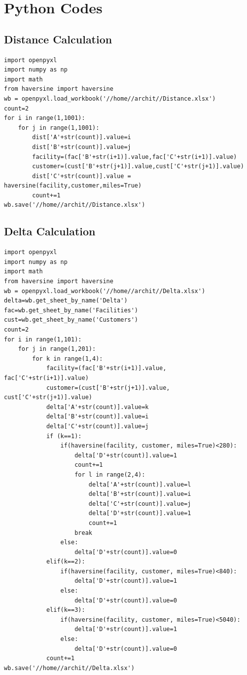 \documentclass[12pt]{article}
\numberwithin{equation}{section}
\begin{document}
\section{Python Codes}
\subsection{Distance Calculation}
\begin{verbatim}
import openpyxl
import numpy as np
import math
from haversine import haversine
wb = openpyxl.load_workbook('//home//archit//Distance.xlsx')
count=2
for i in range(1,1001):
    for j in range(1,1001):
        dist['A'+str(count)].value=i
        dist['B'+str(count)].value=j
        facility=(fac['B'+str(i+1)].value,fac['C'+str(i+1)].value)
        customer=(cust['B'+str(j+1)].value,cust['C'+str(j+1)].value)
        dist['C'+str(count)].value = haversine(facility,customer,miles=True)
        count+=1
wb.save('//home//archit//Distance.xlsx')
\end{verbatim}
\subsection{Delta Calculation}
\begin{verbatim}
import openpyxl
import numpy as np
import math
from haversine import haversine
wb = openpyxl.load_workbook('//home//archit//Delta.xlsx')
delta=wb.get_sheet_by_name('Delta')
fac=wb.get_sheet_by_name('Facilities')
cust=wb.get_sheet_by_name('Customers')
count=2
for i in range(1,101):
    for j in range(1,201):
        for k in range(1,4):
            facility=(fac['B'+str(i+1)].value, fac['C'+str(i+1)].value)
            customer=(cust['B'+str(j+1)].value, cust['C'+str(j+1)].value)
            delta['A'+str(count)].value=k
            delta['B'+str(count)].value=i
            delta['C'+str(count)].value=j
            if (k==1):
                if(haversine(facility, customer, miles=True)<280):
                    delta['D'+str(count)].value=1
                    count+=1
                    for l in range(2,4):
                        delta['A'+str(count)].value=l
                        delta['B'+str(count)].value=i
                        delta['C'+str(count)].value=j
                        delta['D'+str(count)].value=1
                        count+=1
                    break
                else: 
                    delta['D'+str(count)].value=0
            elif(k==2):
                if(haversine(facility, customer, miles=True)<840):
                    delta['D'+str(count)].value=1
                else:
                    delta['D'+str(count)].value=0
            elif(k==3):
                if(haversine(facility, customer, miles=True)<5040):
                    delta['D'+str(count)].value=1
                else:
                    delta['D'+str(count)].value=0
            count+=1
wb.save('//home//archit//Delta.xlsx')
\end{verbatim}
\end{document}
